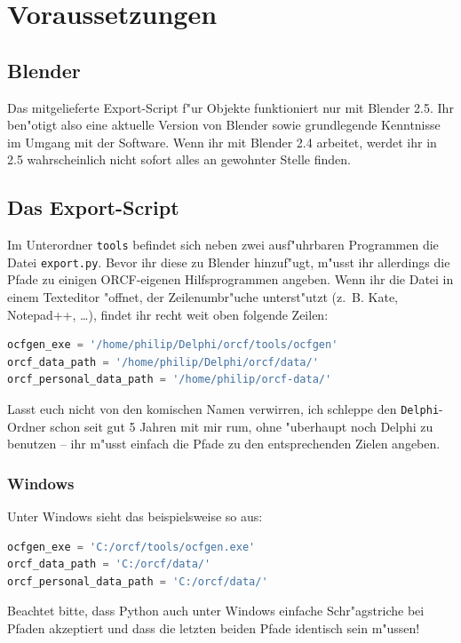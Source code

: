 \documentclass[a4paper]{article}
\newcommand{\cfile}[1]{\texttt{#1}}
\begin{document}
\section{Voraussetzungen}

\subsection{Blender}
Das mitgelieferte Export-Script f"ur Objekte funktioniert nur mit Blender 2.5. Ihr ben"otigt also eine aktuelle Version von Blender sowie grundlegende
Kenntnisse im Umgang mit der Software. Wenn ihr mit Blender 2.4 arbeitet, werdet ihr in 2.5 wahrscheinlich nicht sofort alles an gewohnter Stelle
finden.

\subsection{Das Export-Script}
Im Unterordner \cfile{tools} befindet sich neben zwei ausf"uhrbaren Programmen die Datei \cfile{export.py}. Bevor ihr diese zu Blender hinzuf"ugt,
m"usst ihr allerdings die Pfade zu einigen ORCF-eigenen Hilfsprogrammen angeben. Wenn ihr die Datei in einem Texteditor "offnet, der Zeilenumbr"uche
unterst"utzt (z.\, B. Kate, Notepad++, \dots ), findet ihr recht weit oben folgende Zeilen:
\begin{lstlisting}[language=python]
ocfgen_exe = '/home/philip/Delphi/orcf/tools/ocfgen'
orcf_data_path = '/home/philip/Delphi/orcf/data/'
orcf_personal_data_path = '/home/philip/orcf-data/'
\end{lstlisting}
Lasst euch nicht von den komischen Namen verwirren, ich schleppe den \cfile{Delphi}-Ordner schon seit gut 5 Jahren mit mir rum, ohne "uberhaupt noch
Delphi zu benutzen -- ihr m"usst einfach die Pfade zu den entsprechenden Zielen angeben.

\subsubsection{Windows}
Unter Windows sieht das beispielsweise so aus:
\begin{lstlisting}[language=python]
ocfgen_exe = 'C:/orcf/tools/ocfgen.exe'
orcf_data_path = 'C:/orcf/data/'
orcf_personal_data_path = 'C:/orcf/data/'
\end{lstlisting}

Beachtet bitte, dass Python auch unter Windows einfache Schr"agstriche bei Pfaden akzeptiert und dass die letzten beiden Pfade identisch sein m"ussen!
\end{document}
